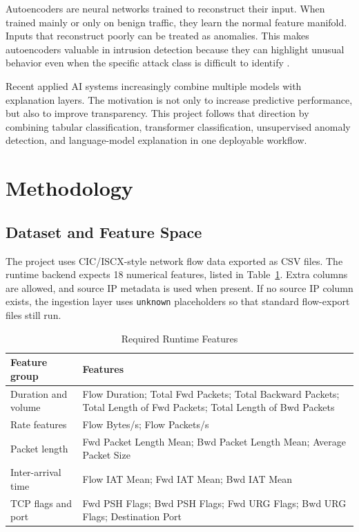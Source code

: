 \documentclass[12pt,a4paper]{article}
\begin{document}
Autoencoders are neural networks trained to reconstruct their input. When trained mainly or only on benign traffic, they learn the normal feature manifold. Inputs that reconstruct poorly can be treated as anomalies. This makes autoencoders valuable in intrusion detection because they can highlight unusual behavior even when the specific attack class is difficult to identify \cite{rumelhart}.

Recent applied AI systems increasingly combine multiple models with explanation layers. The motivation is not only to increase predictive performance, but also to improve transparency. This project follows that direction by combining tabular classification, transformer classification, unsupervised anomaly detection, and language-model explanation in one deployable workflow.

\section{Methodology}

\subsection{Dataset and Feature Space}

The project uses CIC/ISCX-style network flow data exported as CSV files. The runtime backend expects 18 numerical features, listed in Table~\ref{tab:features}. Extra columns are allowed, and source IP metadata is used when present. If no source IP column exists, the ingestion layer uses \texttt{unknown} placeholders so that standard flow-export files still run.

\begin{table}[H]
\centering
\caption{Required Runtime Features}
\label{tab:features}
\small
\begin{tabularx}{\linewidth}{X X}
\toprule
Feature group & Features \\
\midrule
Duration and volume & Flow Duration; Total Fwd Packets; Total Backward Packets; Total Length of Fwd Packets; Total Length of Bwd Packets \\
Rate features & Flow Bytes/s; Flow Packets/s \\
Packet length & Fwd Packet Length Mean; Bwd Packet Length Mean; Average Packet Size \\
Inter-arrival time & Flow IAT Mean; Fwd IAT Mean; Bwd IAT Mean \\
TCP flags and port & Fwd PSH Flags; Bwd PSH Flags; Fwd URG Flags; Bwd URG Flags; Destination Port \\
\bottomrule
\end{tabularx}
\end{table}
\end{document}
